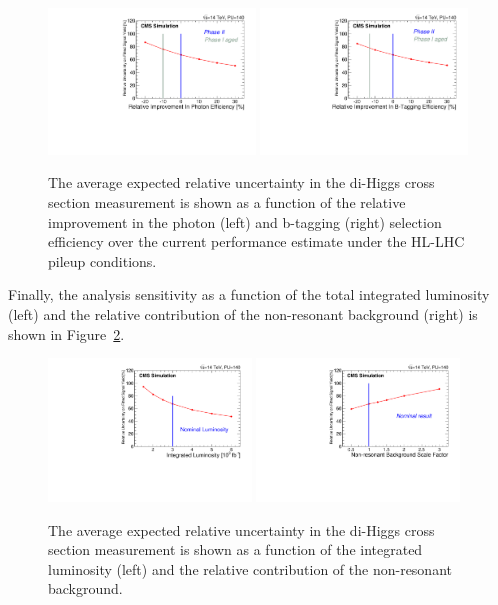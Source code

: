 \begin{figure}[h]
  \centering
  \includegraphics[width=0.49\textwidth]{figures_chapter6/XSUncertaintyVsPhotonEffRatio.pdf}
  \includegraphics[width=0.49\textwidth]{figures_chapter6/XSUncertaintyVsBtagEffRatio.pdf}
  \caption{ The average expected relative uncertainty in the di-Higgs cross section measurement
  is shown as a function of the relative improvement in the photon (left) and b-tagging (right) selection efficiency 
  over the current performance estimate under the HL-LHC
  pileup conditions.}
  \label{fig:PhotonEffImprovementScan}
\end{figure}


Finally, the analysis sensitivity as a function of the total
integrated luminosity (left) and the relative contribution of the non-resonant background (right) is shown in Figure~\ref{fig:LumiScan}.

\begin{figure}[h]
  \centering
  \includegraphics[width=0.48\textwidth]{figures_chapter6/XSUncertaintyVsLumi.pdf}
 \includegraphics[width=0.48\textwidth]{figures_chapter6/XSUncertaintyVsNonResBkgScaleFactor.pdf} 
  \caption {The average expected relative uncertainty in the di-Higgs cross section measurement 
  is shown  as a function of the integrated luminosity (left) and the relative contribution of the non-resonant background.}
  \label{fig:LumiScan}
\end{figure}


